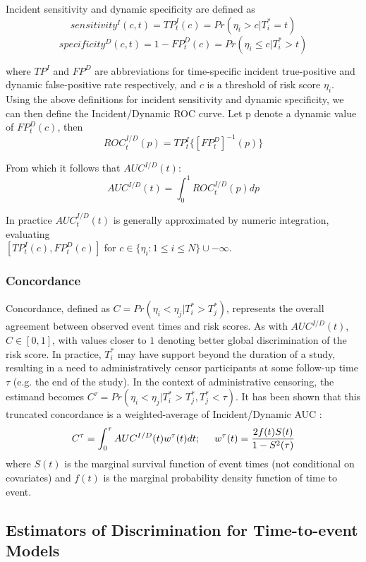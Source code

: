 \documentclass[useAMS,usenatbib, referee]{biom}
\begin{document}
Incident sensitivity and dynamic specificity are defined as
\[
    sensitivity^{I}(c,t) = {TP}_t^{I}(c) = Pr(\eta_i > c|T_i^* = t)
\]
\[
    specificity^{D}(c,t) = 1-FP_t^{D}(c) = Pr(\eta_i \leq c|T_i^* > t) 
\]

where $TP^I$ and $FP^D$ are abbreviations for time-specific incident true-positive and dynamic false-positive rate respectively, and $c$ is a threshold of risk score $\eta_i$. Using the above definitions for incident sensitivity and dynamic specificity, we can then define the Incident/Dynamic ROC curve. Let p denote a dynamic value of $FP_t^{D}(c)$, then 
\[
ROC_t^{I/D}(p) = TP_t^{I}\{[FP_t^{D}]^{-1}(p)\}
\]

From which it follows that $AUC^{I/D}(t)$: 
\[
   AUC^{I/D}(t) = \int_0^1 ROC_t^{I/D}(p)dp
\]

In practice $AUC_t^{I/D}(t)$ is generally approximated by numeric integration, evaluating \\$[TP_t^{I}(c), FP_t^{D}(c)]$ for $c \in \{\eta_i: 1 \leq i \leq N\} \cup -\infty$. 

\subsubsection{Concordance}
\label{par:define_c}

Concordance, defined as $C = Pr(\eta_i < \eta_j| T_i^* > T_j^*)$, represents the overall agreement between observed event times and risk scores. As with $AUC^{I/D}(t)$, $C \in [0,1]$, with values closer to $1$ denoting better global discrimination of the risk score. In practice, $T_i^*$ may have support beyond the duration of a study, resulting in a need to administratively censor participants at some follow-up time $\tau$ (e.g. the end of the study). In the context of administrative censoring, the estimand becomes $C^\tau = Pr(\eta_i < \eta_j| T_i^* > T_j^*, T_j^* < \tau)$. It has been shown that this truncated concordance is a weighted-average of Incident/Dynamic AUC \citep{hz2005}:
\[
C^\tau = \int_0^{\tau} 
AUC^{I/D}(t)w^{\tau}(t)dt;
\hspace{0.5cm}
w^{\tau}(t) = \frac{2f(t)S(t)}{1-S^2(\tau)}
\]
where $S(t)$ is the marginal survival function of event times (not conditional on covariates) and $f(t)$ is the marginal probability density function of time to event. 

\subsection{Estimators of Discrimination for Time-to-event Models}
\label{subsec:methods_estimators}
\end{document}
